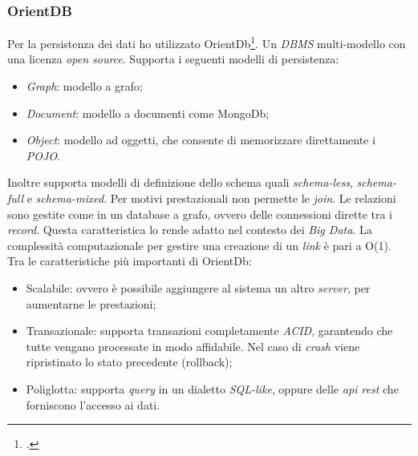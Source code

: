 \subsubsection{OrientDB}
Per la persistenza dei dati ho utilizzato OrientDb\footcite{http://orientdb.com/}. Un \emph{DBMS} multi-modello con una licenza \emph{open source}. Supporta i seguenti modelli di persistenza:
\begin{itemize}
\item \emph{Graph}: modello a grafo; 
\item \emph{Document}: modello a documenti come MongoDb;
\item \emph{Object}: modello ad oggetti, che consente di memorizzare direttamente i \emph{POJO}.
\end{itemize}
Inoltre supporta modelli di definizione dello schema quali \emph{schema-less}, \emph{schema-full} e \emph{schema-mixed}. Per motivi prestazionali non permette le \emph{join}. Le relazioni sono gestite come in un database a grafo, ovvero delle connessioni dirette tra i \emph{record}. Questa caratteristica lo rende adatto nel contesto dei \emph{Big Data}. La complessità computazionale per gestire una creazione di un \emph{link} è pari a O(1). Tra le caratteristiche più importanti di OrientDb:
\begin{itemize}
\item Scalabile: ovvero è possibile aggiungere al sistema un altro \emph{server}, per aumentarne le prestazioni;
\item Transazionale: supporta transazioni completamente \emph{ACID}, garantendo che tutte vengano processate in modo affidabile. Nel caso di \emph{crash} viene ripristinato lo stato precedente (rollback);
\item Poliglotta: supporta \emph{query} in un dialetto \emph{SQL-like}, oppure delle \emph{\gls{api} \gls{rest}} che forniscono l'accesso ai dati.
\end{itemize}
